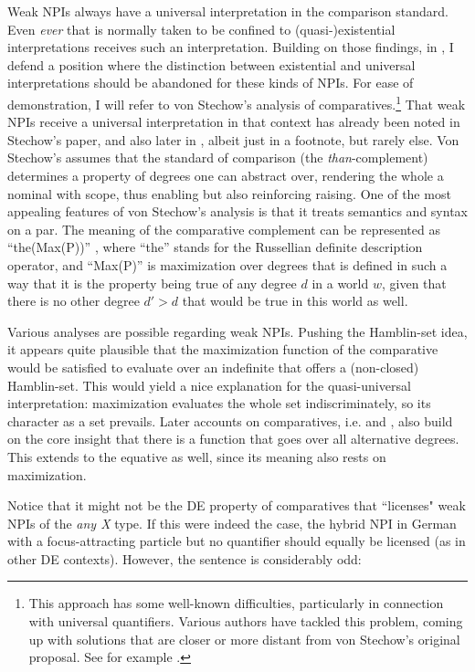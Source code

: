 \documentclass[output=paper,colorlinks,citecolor=brown,
]{langscibook}
\begin{document}
Weak NPIs always have a universal interpretation in the comparison standard. Even \textit{ever} that is normally taken to be confined to (quasi-)existential interpretations receives such an interpretation. Building on those findings, in \citet{neubarth2017}, I defend a position where the distinction between existential and universal
interpretations should be abandoned for these kinds of NPIs.
For ease of demonstration, I will refer to von Stechow's \citeyearpar{stechow1984} analysis of
comparatives.\footnote{This approach has some well-known difficulties, particularly in connection with universal quantifiers. Various authors have
tackled this problem, coming up with solutions that are closer or more distant from von Stechow's original proposal.
See for example \citet{schwarzschwilk2002,heim2006,beck2010,fleisher2016}.} 
That weak NPIs receive a universal interpretation in that context has already been noted in Stechow's paper, and also later in \citet{schwarzschwilk2002}, albeit just in a footnote, but rarely else.
Von Stechow's assumes that the standard
of comparison (the \textit{than}-complement) determines a property of degrees one can abstract over, rendering the
whole a nominal with scope, thus enabling but also reinforcing raising. One of the most appealing features of von
Stechow's analysis is that it treats semantics and syntax on a par. The meaning of the comparative complement can be
represented as ``the(Max(P))'' \citep[55]{stechow1984}, where “the” stands for the Russellian definite description
operator, and “Max(P)” is maximization over degrees that is defined in such a way that it is the property being true of
any degree $d$ in a world $w$, given that there is no other degree $d' > d$ that would be true in this world as well.

Various analyses are possible regarding weak NPIs. Pushing the Hamblin-set idea, it appears quite plausible that the maximization function
of the comparative would be satisfied to evaluate over an indefinite that offers a (non-closed) Hamblin-set. This would yield a
nice explanation for the quasi-universal interpretation: maximization
evaluates the whole set indiscriminately, so its character as a set prevails. Later accounts on comparatives, i.e.
\citet{stechow1996} and \citet{heim2000}, also build on the core insight that there is a function that goes over all
alternative degrees. This extends to the equative as well, since its meaning also rests on maximization.

Notice that it might not be the DE property of comparatives that ``licenses" weak NPIs of the \textit{any X} type. If this were indeed the case, the hybrid NPI in German with a focus-attracting particle but no quantifier should equally be licensed (as in other DE contexts). However, the sentence is considerably odd:
\end{document}
